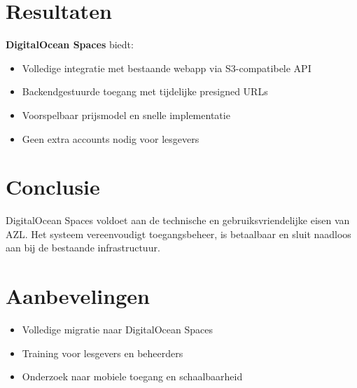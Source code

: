 \documentclass[a0,portrait]{hogent-poster}
\begin{document}
\begin{multicols}{2}
\section*{Resultaten}
\textbf{DigitalOcean Spaces} biedt:
\begin{itemize}
  \item Volledige integratie met bestaande webapp via S3-compatibele API
  \item Backendgestuurde toegang met tijdelijke presigned URLs
  \item Voorspelbaar prijsmodel en snelle implementatie
  \item Geen extra accounts nodig voor lesgevers
\end{itemize}

\begin{center}
  \captionsetup{type=figure}
\end{center}

\section*{Conclusie}
DigitalOcean Spaces voldoet aan de technische en gebruiksvriendelijke eisen van AZL. Het systeem vereenvoudigt toegangsbeheer, is betaalbaar en sluit naadloos aan bij de bestaande infrastructuur.

\section*{Aanbevelingen}
\begin{itemize}
  \item Volledige migratie naar DigitalOcean Spaces
  \item Training voor lesgevers en beheerders
  \item Onderzoek naar mobiele toegang en schaalbaarheid
\end{itemize}

\end{multicols}
\end{document}
